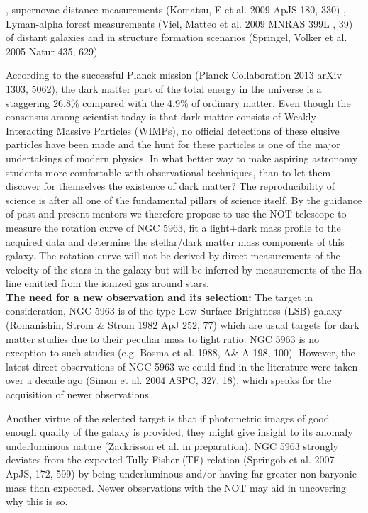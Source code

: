 \documentclass[11pt]{article}           %
\begin{document}
\begin{scienpage}[][]{}
{, supernovae distance measurements (Komatsu, E et al. 2009 ApJS 180, 330)
, Lyman-alpha forest measurements (Viel, Matteo et al. 2009 MNRAS 399L , 39) of distant galaxies
 and in structure formation scenarios (Springel, Volker et al. 2005 Natur 435, 629).
\par
According to the successful Planck mission (Planck Collaboration 2013 arXiv 1303, 5062), the dark matter
part of the total energy in the universe is a staggering 26.8\%
compared with the 4.9\% of ordinary matter. Even though the consensus among scientist
today is that dark matter consists of Weakly Interacting Massive Particles
(WIMPs), no official detections of these elusive particles have been made and
the hunt for these particles is one of the major undertakings of modern physics.
In what better way to make aspiring astronomy students more comfortable
with observational techniques, than to let them discover for
themselves the existence of dark matter? The reproducibility of science is
after all one of the fundamental pillars of science itself.
By the guidance of past and present mentors we therefore propose to use the
NOT telescope
to measure the rotation curve of NGC 5963, fit a light+dark mass profile 
to the acquired data and determine the stellar/dark matter mass components of
this galaxy. The rotation curve will not be derived by direct measurements 
of the velocity of the stars in the galaxy but will be inferred by measurements
of the H$\alpha$ line emitted from the ionized gas around stars.   \\

\noindent \textbf{The need for a new observation and its selection:} The target in consideration, NGC 5963 is of the type Low Surface Brightness (LSB) galaxy (Romanishin, Strom \& Strom 1982 ApJ 252, 77) which are usual targets for dark matter studies due to their peculiar mass to light ratio. NGC 5963 is no exception to such studies (e.g. Bosma et al. 1988, A\& A 198, 100). However, the latest  direct observations of NGC 5963 we could find in the literature were taken over a decade ago (Simon et al. 2004 ASPC, 327, 18), which speaks for the acquisition of newer observations. 
\par
Another virtue of the selected target is that if photometric images of good enough quality of the galaxy is provided, they might give insight to its anomaly underluminous nature (Zackrisson et al. in preparation). NGC 5963 strongly deviates from the expected Tully-Fisher (TF) relation (Springob et al. 2007 ApJS, 172, 599) by being underluminous and/or having far greater non-baryonic mass than expected. Newer observations with the NOT may aid in uncovering why this is so.
 
   }
\end{scienpage}
\end{document}
